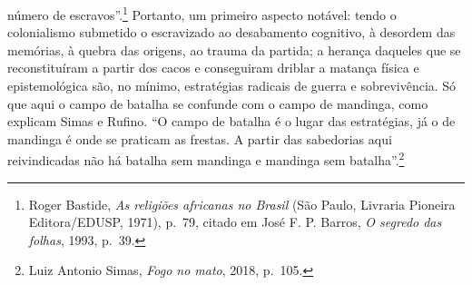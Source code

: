 número de escravos''.\footnote{Roger Bastide, \textit{As religiões
  africanas no Brasil} (São Paulo, Livraria Pioneira Editora/EDUSP,
  1971), p.~79, citado em José F. P. Barros, \textit{O segredo das
  folhas}, 1993, p.~39.} Portanto, um primeiro aspecto notável: tendo o
colonialismo submetido o escravizado ao desabamento cognitivo, à
desordem das memórias, à quebra das origens, ao trauma da partida; a
herança daqueles que se reconstituíram a partir dos cacos e conseguiram
driblar a matança física e epistemológica são, no mínimo, estratégias
radicais de guerra e sobrevivência. Só que aqui o campo de batalha se
confunde com o campo de mandinga, como explicam Simas e Rufino. ``O
campo de batalha é o lugar das estratégias, já o de mandinga é onde se
praticam as frestas. A partir das sabedorias aqui reivindicadas não há
batalha sem mandinga e mandinga sem batalha''.\footnote{Luiz Antonio
  Simas, \textit{Fogo no mato}, 2018, p.~105.}

